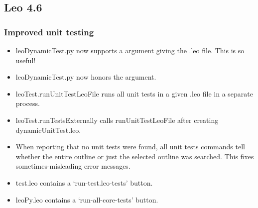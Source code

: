 \documentclass[a4paper,10pt,english]{sphinxmanual}
\begin{document}
\subsection{Leo 4.6}
\label{what-is-new:leo-4-6}

\subsubsection{Improved unit testing}
\label{what-is-new:improved-unit-testing}\begin{itemize}
\item {} 
leoDynamicTest.py now supports a  argument giving the .leo file.
This is so useful!

\item {} 
leoDynamicTest.py now honors the  argument.

\item {} 
leoTest.runUnitTestLeoFile runs all unit tests in a given .leo file
in a separate process.

\item {} 
leoTest.runTestsExternally calls runUnitTestLeoFile after creating
dynamicUnitTest.leo.

\item {} 
When reporting that no unit tests were found, all unit tests commands tell
whether the entire outline or just the selected outline was searched.
This fixes sometimes-misleading error messages.

\item {} 
test.leo contains a `run-test.leo-tests' button.

\item {} 
leoPy.leo contains a `run-all-core-tests' button.

\end{itemize}
\end{document}
